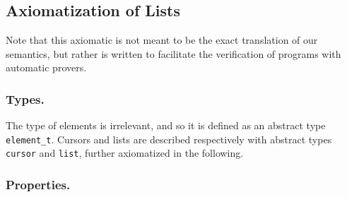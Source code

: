 \documentclass[runningheads,a4paper]{llncs}
\newcommand{\beforesub}{\vspace{-0.2cm}}
\newcommand{\aftersub}{\vspace{-0.1cm}}
\begin{document}
\beforesub
\subsection{Axiomatization of Lists}
\aftersub

Note that this axiomatic is not meant to be the exact translation of our
semantics, but rather is written to facilitate the verification of programs
with automatic provers.

\subsubsection{Types.}

The type of elements is irrelevant, and so it is defined as an abstract
type \verb|element_t|. Cursors and lists are described respectively with abstract types
\verb|cursor| and \verb|list|, further axiomatized in the following.

\subsubsection{Properties.}
\end{document}
